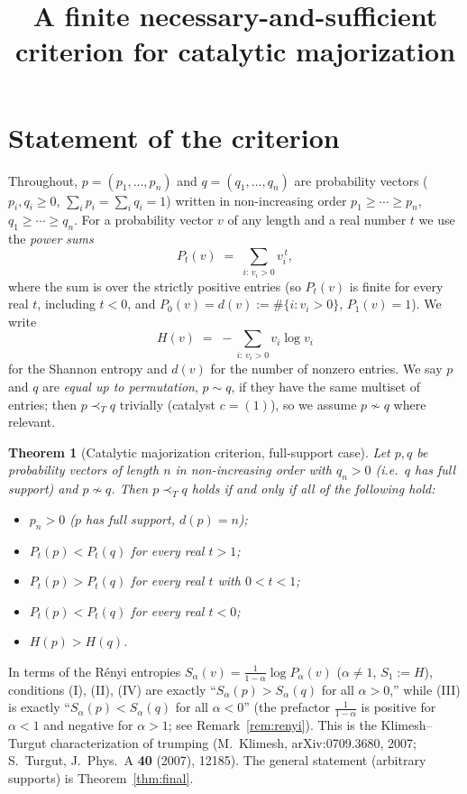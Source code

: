 \documentclass{amsart}
\theoremstyle{plain}
\newtheorem{theorem}{Theorem}
\theoremstyle{definition}
\newcommand{\trump}{\prec_T}
\begin{document}
\title{A finite necessary-and-sufficient criterion for catalytic majorization}
\maketitle

\section{Statement of the criterion}

Throughout, $p=(p_1,\dots,p_n)$ and $q=(q_1,\dots,q_n)$ are probability vectors
($p_i,q_i\ge 0$, $\sum_i p_i=\sum_i q_i=1$) written in non-increasing order
$p_1\ge\cdots\ge p_n$, $q_1\ge\cdots\ge q_n$. For a probability vector $v$ of any
length and a real number $t$ we use the \emph{power sums}
\[
  P_t(v)\;=\;\sum_{i:\,v_i>0} v_i^{\,t},
\]
where the sum is over the strictly positive entries (so $P_t(v)$ is finite for every
real $t$, including $t<0$, and $P_0(v)=d(v):=\#\{i:v_i>0\}$, $P_1(v)=1$). We write
\[
  H(v)\;=\;-\sum_{i:\,v_i>0} v_i\log v_i
\]
for the Shannon entropy and $d(v)$ for the number of nonzero entries. We say $p$ and
$q$ are \emph{equal up to permutation}, $p\sim q$, if they have the same multiset of
entries; then $p\trump q$ trivially (catalyst $c=(1)$), so we assume $p\not\sim q$
where relevant.

\begin{theorem}[Catalytic majorization criterion, full-support case]\label{thm:main}
Let $p,q$ be probability vectors of length $n$ in non-increasing order with
$q_n>0$ (i.e.\ $q$ has full support) and $p\not\sim q$. Then $p\trump q$ holds if and
only if all of the following hold:
\begin{itemize}
\item[\textnormal{(0)}] $p_n>0$ \quad ($p$ has full support, $d(p)=n$);
\item[\textnormal{(I)}] $P_t(p)<P_t(q)$ for every real $t>1$;
\item[\textnormal{(II)}] $P_t(p)>P_t(q)$ for every real $t$ with $0<t<1$;
\item[\textnormal{(III)}] $P_t(p)<P_t(q)$ for every real $t<0$;
\item[\textnormal{(IV)}] $H(p)>H(q)$.
\end{itemize}
\end{theorem}

In terms of the R\'enyi entropies $S_\alpha(v)=\frac{1}{1-\alpha}\log P_\alpha(v)$
($\alpha\ne1$, $S_1:=H$), conditions \textnormal{(I)}, \textnormal{(II)},
\textnormal{(IV)} are exactly ``$S_\alpha(p)>S_\alpha(q)$ for all $\alpha>0$,'' while
\textnormal{(III)} is exactly ``$S_\alpha(p)<S_\alpha(q)$ for all $\alpha<0$'' (the
prefactor $\frac1{1-\alpha}$ is positive for $\alpha<1$ and negative for $\alpha>1$;
see Remark~\ref{rem:renyi}). This is the Klimesh--Turgut characterization of trumping
(M.~Klimesh, arXiv:0709.3680, 2007; S.~Turgut, J.\ Phys.\ A \textbf{40} (2007), 12185).
The general statement (arbitrary supports) is Theorem~\ref{thm:final}.
\end{document}
